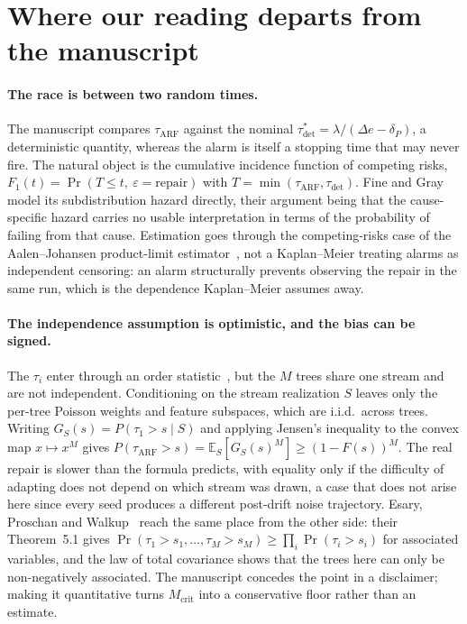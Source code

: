 \documentclass[10pt,a4paper]{article}
\begin{document}
\section{Where our reading departs from the manuscript}

\paragraph{The race is between two random times.} The manuscript compares
$\tau_{\mathrm{ARF}}$ against the nominal $\tau^{*}_{\det}=\lambda/(\Delta e-\delta_P)$, a
deterministic quantity, whereas the alarm is itself a stopping time that may never fire.
The natural object is the cumulative incidence function of competing risks,
$F_1(t)=\Pr(T\le t,\ \varepsilon=\text{repair})$ with
$T=\min(\tau_{\mathrm{ARF}},\tau_{\det})$. Fine and Gray~\cite{fine1999} model its
subdistribution hazard directly, their argument being that the cause-specific hazard
carries no usable interpretation in terms of the probability of failing from that cause.
Estimation goes through the competing-risks case of the Aalen--Johansen product-limit
estimator~\cite{aalen1978}, not a Kaplan--Meier treating alarms as independent censoring:
an alarm structurally prevents observing the repair in the same run, which is the
dependence Kaplan--Meier assumes away.

\paragraph{The independence assumption is optimistic, and the bias can be signed.} The
$\tau_i$ enter through an order statistic~\cite{david2003}, but the $M$ trees share one
stream and are not independent. Conditioning on the stream realization $S$ leaves only the
per-tree Poisson weights and feature subspaces, which are i.i.d.\ across trees. Writing
$G_S(s)=P(\tau_1>s\mid S)$ and applying Jensen's inequality to the convex map
$x\mapsto x^{M}$ gives $P(\tau_{\mathrm{ARF}}>s)=\mathbb{E}_S[G_S(s)^M]\ge(1-F(s))^{M}$.
The real repair is slower than the formula predicts, with equality only if the difficulty
of adapting does not depend on which stream was drawn, a case that does not arise here
since every seed produces a different post-drift noise trajectory. Esary, Proschan and
Walkup~\cite{esary1967} reach the same place from the other side: their Theorem~5.1 gives
$\Pr(\tau_1>s_1,\dots,\tau_M>s_M)\ge\prod_i\Pr(\tau_i>s_i)$ for associated variables, and
the law of total covariance shows that the trees here can only be non-negatively
associated. The manuscript concedes the point in a disclaimer; making it quantitative turns
$M_{\mathrm{crit}}$ into a conservative floor rather than an estimate.
\end{document}
